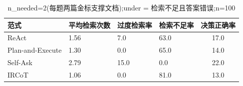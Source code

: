 \begin{table}[htbp]
\centering
\caption{n_needed=2(每题两篇金标支撑文档);under = 检索不足且答案错误;n=100}
\begin{tabular}{llllc}
\toprule
范式 & 平均检索次数 & 过度检索率 & 检索不足率 & 决策正确率 \\
\midrule
ReAct & 1.56 & 7.0 & 63.0 & 17.0 \\
Plan-and-Execute & 1.30 & 0.0 & 65.0 & 14.0 \\
Self-Ask & 2.79 & 15.0 & 0.0 & 22.0 \\
IRCoT & 1.06 & 0.0 & 81.0 & 13.0 \\
\bottomrule
\end{tabular}
\end{table}
